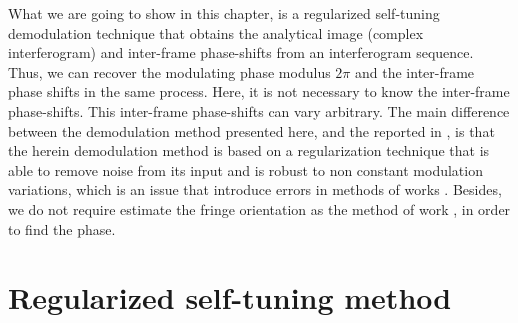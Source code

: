 What we are going to show in this chapter, is a regularized self-tuning
demodulation technique that obtains the analytical image (complex
interferogram) and inter-frame phase-shifts from an interferogram
sequence. Thus, we can recover the modulating phase modulus $2\pi$
and the inter-frame phase shifts in the same process. Here, it is
not necessary to know the inter-frame phase-shifts. This inter-frame
phase-shifts can vary arbitrary. The main difference between the demodulation
method presented here, and the reported in \cite{Kong,Wang:04,Larkin:02}, is
that the herein demodulation method is based on a regularization technique
that is able to remove noise from its input and is robust to non constant
modulation variations, which is an issue that introduce errors in
methods of works \cite{Kong,Wang:04}. Besides, we do not require estimate
the fringe orientation as the method of work \cite{Larkin:02}, in order to
find the phase.


\section{Regularized self-tuning method}

